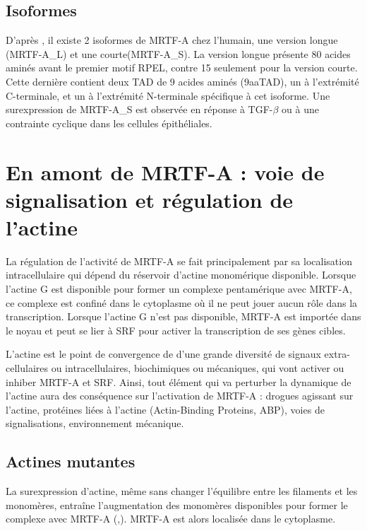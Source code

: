 \documentclass{report}
\begin{document}
 \subsection{Isoformes}
 D'après \cite{scharenberg_tgf-_2014}, il existe 2 isoformes de MRTF-A chez l'humain, une version longue (MRTF-A\_L) et une courte(MRTF-A\_S). La version longue présente 80 acides aminés avant le premier motif RPEL, contre 15 seulement pour la version courte. Cette dernière contient deux TAD de 9 acides aminés (9aaTAD), un à l'extrémité C-terminale, et un à l'extrémité N-terminale spécifique à cet isoforme. Une surexpression de MRTF-A\_S est observée en réponse à TGF-$\beta$ ou à une contrainte cyclique dans les cellules épithéliales. 
 
 



\section{En amont de MRTF-A : voie de signalisation et régulation de l'actine} 


La régulation de l'activité de MRTF-A se fait principalement par sa localisation intracellulaire qui dépend du réservoir d'actine monomérique disponible. 
Lorsque l'actine G est disponible pour former un complexe pentamérique avec MRTF-A, ce complexe est confiné dans le cytoplasme où il ne peut jouer aucun rôle dans la transcription. 
Lorsque l'actine G n'est pas disponible, MRTF-A est importée dans le noyau et peut se lier à SRF pour activer la transcription de ses gènes cibles. 

L'actine est le point de convergence de d'une grande diversité de signaux extra-cellulaires ou intracellulaires, biochimiques ou mécaniques, qui vont activer ou inhiber MRTF-A et SRF. 
Ainsi, tout élément qui va perturber la dynamique de l'actine aura des conséquence sur l'activation de MRTF-A : drogues agissant sur l'actine, protéines liées à l'actine (Actin-Binding Proteins, ABP), voies de signalisations, environnement mécanique. 


\subsection{Actines mutantes}

La surexpression d'actine, même sans changer l'équilibre entre les filaments et les monomères, entraîne l'augmentation des monomères disponibles pour former le complexe avec MRTF-A (\cite{miralles_actin_2003},\cite{vartiainen_nuclear_2007}). MRTF-A est alors localisée dans le cytoplasme. 
\end{document}
